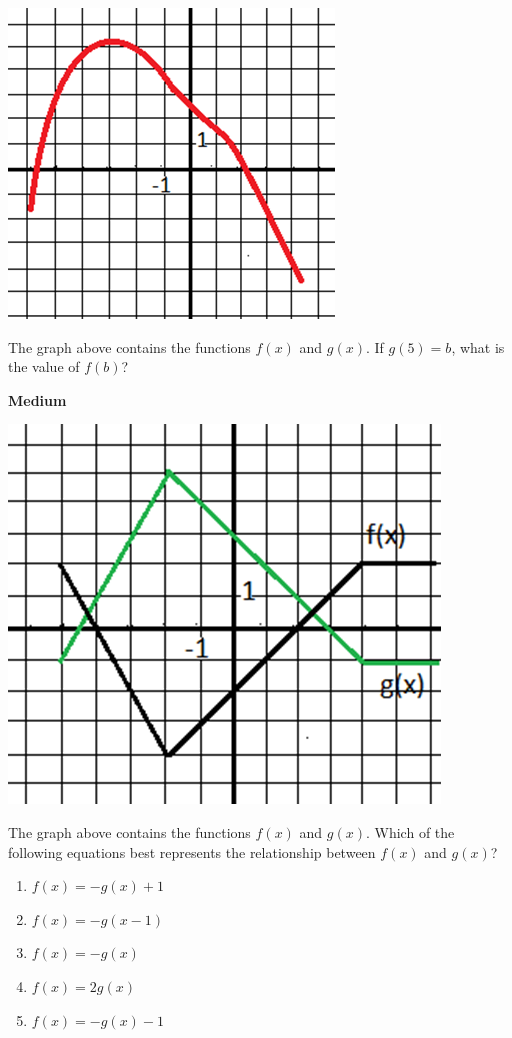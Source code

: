 \documentclass[12pt]{book}
\newcommand{\medium}{\textbf{Medium} }
\begin{document}
\begin{multienumerate}
{\includegraphics{51}

The graph above contains the functions $f(x)$ and $g(x)$. If $g(5)=b$, what is the value of $f(b)$?
}{\medium

\includegraphics{52}

The graph above contains the functions $f(x)$ and $g(x)$. Which of the following equations best represents the relationship between $f(x)$ and $g(x)$?

\begin{enumerate}[label=(\Alph*)]
\item $f(x)=-g(x)+1$
\item $f(x)=-g(x-1)$
\item $f(x)=-g(x)$
\item $f(x)=2g(x)$
\item $f(x)=-g(x)-1$
\end{enumerate}}


\end{multienumerate}
\end{document}
